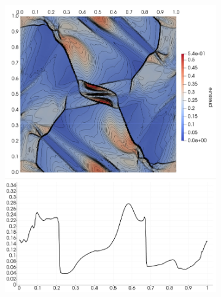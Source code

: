 \begin{figure}[H]
\centering
\begin{subfigure}[b]{0.425\textwidth}\includegraphics[width=\textwidth]{img/ot/my5.jpg}\end{subfigure}
\hspace{12mm}

\end{figure}
